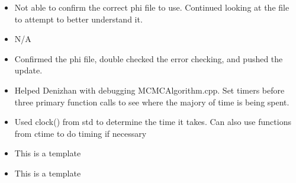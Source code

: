 \documentclass[12pt,hyperref]{labbook}
\begin{document}
\begin{itemize}
  \item Not able to confirm the correct phi file to use. Continued looking at
the  file to attempt to better understand it.  
\end{itemize}
\begin{itemize}
  \item N/A
\end{itemize}

\begin{itemize}
  \item Confirmed the phi file, double checked the error checking, and pushed
the update. 
  \item Helped Denizhan with debugging MCMCAlgorithm.cpp. Set timers before
three primary function calls to see where the majory of time is being spent.  
\end{itemize}
\begin{itemize}
  \item Used clock() from std to determine the time it takes. Can also use
functions from ctime to do timing if necessary
\end{itemize}








\begin{itemize}
  \item This is a template
\end{itemize}
\begin{itemize}
  \item This is a template
\end{itemize}


 
\end{document}
